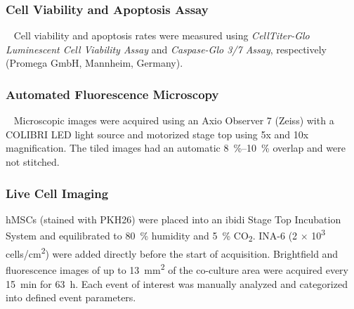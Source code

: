 \subsubsection*{Cell Viability and Apoptosis Assay}
\ %
Cell viability and apoptosis rates were measured using \textit{CellTiter-Glo Luminescent
    Cell Viability Assay} and \textit{Caspase-Glo 3/7 Assay}, respectively (Promega GmbH,
Mannheim, Germany).



\subsubsection*{Automated Fluorescence Microscopy}
\ %
Microscopic images were acquired using an Axio Observer 7 (Zeiss) with a COLIBRI LED
light source and motorized stage top using 5x and 10x magnification. The tiled images had
an automatic \SIrange{8}{10}{\percent} overlap and were not stitched.



\subsubsection*{Live Cell Imaging}
hMSCs (stained with PKH26) were placed into an ibidi Stage Top Incubation System
and equilibrated to \SI{80}{\percent} humidity and \SI{5}{\percent}
CO\textsubscript{2}. INA-6 (2 $\times$ 10\textsuperscript{3}
cells/cm\textsuperscript{2}) were added directly before the start of
acquisition. Brightfield and fluorescence images of up to \SI{13}{\mm\squared}
of the co-culture area were acquired every \SI{15}{\minute} for \SI{63}{\hour}.
Each event of interest was manually analyzed and categorized into defined event
parameters.




